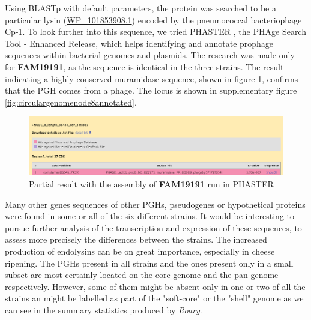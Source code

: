 \documentclass[10pt,a4paper]{article}
\begin{document}
\noindent Using BLASTp\cite{altschul_gapped_1997} with default parameters, the protein was searched to be a particular lysin (\href{https://www.ncbi.nlm.nih.gov/protein/1325986555}{WP\_101853908.1}) encoded by the pneumococcal bacteriophage Cp-1\cite{martin_pneumococcal_1998}. To look further into this sequence, we tried PHASTER \cite{arndt_phaster:_2016}, the PHAge Search Tool - Enhanced Release, which helps identifying and annotate prophage sequences within bacterial genomes and plasmids. The research was made only for \textbf{FAM19191}, as the sequence is identical in the three strains. The result indicating a highly conserved muramidase sequence, shown in figure \ref{fig:phasterresultmuramidase}, confirms that the PGH comes from a phage. The locus is shown in supplementary figure \ref{fig:circulargenomenode8annotated}. 

\begin{figure}[H]
	\centering
	\includegraphics[width=1\linewidth]{img/phaster_result_muramidase}
	\caption{Partial result with the assembly of \textbf{FAM19191} run in PHASTER}
	\label{fig:phasterresultmuramidase}
\end{figure}

\noindent Many other genes sequences of other PGHs, pseudogenes or hypothetical proteins were found in some or all of the six different strains. It would be interesting to pursue further analysis of the transcription and expression of these sequences, to assess more precisely the differences between the strains. The increased production of endolysins can be on great importance, especially in cheese ripening. The PGHs present in all strains and the ones present only in a small subset are most certainly located on the core-genome and the pan-genome respectively. However, some of them might be absent only in one or two of all the strains an might be labelled as part of the "soft-core" or the "shell" genome \cite{kaas_estimating_2012,inglin_clustering_2018} as we can see in the summary statistics produced by \textit{Roary}.

\newpage


\begin{multicols}{2}
	{}
	
\end{multicols}	
\end{document}
